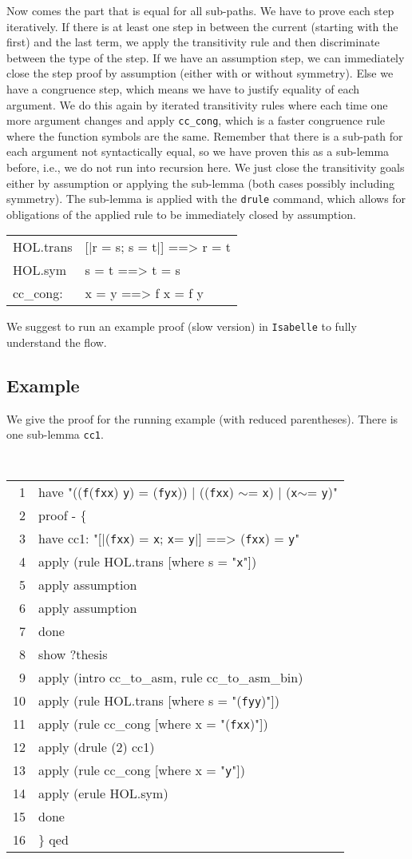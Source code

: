 \documentclass[10pt,a4paper]{article}
\newcommand{\isa}{\texttt{Isabelle}\xspace}
\newcommand{\ttt}{\texttt}
\newcommand{\negat}{\ensuremath{\sim}}
\newcommand{\x}{\xX\xspace}
\newcommand{\y}{\yX\xspace}
\newcommand{\f}{\ttt{f}\xspace}
\newcommand{\xX}{\ttt{x}}
\newcommand{\yX}{\ttt{y}}
\newenvironment{pt}[1]{\begin{center}\begin{tt}\begin{tabular}{#1}\hline}{\end{tabular}\end{tt}\end{center}}
\newcommand{\pl}[1]{#1 \\[1mm]}
\newcommand{\pll}[1]{#1 \\\hline}
\begin{document}
Now comes the part that is equal for all sub-paths. We have to prove each step iteratively. If there is at least one step in between the current (starting with the first) and the last term, we apply the transitivity rule and then discriminate between the type of the step. If we have an assumption step, we can immediately close the step proof by assumption (either with or without symmetry). Else we have a congruence step, which means we have to justify equality of each argument. We do this again by iterated transitivity rules where each time one more argument changes and apply \ttt{cc\_cong}, which is a faster congruence rule where the function symbols are the same. Remember that there is a sub-path for each argument not syntactically equal, so we have proven this as a sub-lemma before, i.e., we do not run into recursion here. We just close the transitivity goals either by assumption or applying the sub-lemma (both cases possibly including symmetry). The sub-lemma is applied with the \ttt{drule} command, which allows for obligations of the applied rule to be immediately closed by assumption.
%
\begin{pt}{ll}
	\pl{HOL.trans & [|r = s; s = t|] ==> r = t}
	\pl{HOL.sym & s = t ==> t = s}
	\pll{cc\_cong: & x = y ==> f x = f y}
\end{pt}

We suggest to run an example proof (slow version) in \isa to fully understand the flow.
%
\subsection*{Example}
We give the proof for the running example (with reduced parentheses). There is one sub-lemma \ttt{cc1}.

\begin{center}
	\tt
	\begin{tabular}{rl}
		1 & have "((\f (\f \x \x) \y) = (\f \y \x)) | ((\f \x \x) \negat= \x) | (\x \negat= \y)" \\
		2 & proof - $\lbrace$ \\
		3 & have cc1: "[|(\f \x \x) = \x; \x = \yX|] ==> (\f \x \x) = \yX" \\
		4 & apply (rule HOL.trans [where s = "\xX"]) \\
		5 & apply assumption \\
		6 & apply assumption \\
		7 & done \\
		8 & show ?thesis \\
		9 & apply (intro cc\_to\_asm, rule cc\_to\_asm\_bin) \\
		10 & apply (rule HOL.trans [where s = "(\f \y \y)"]) \\
		11 & apply (rule cc\_cong [where x = "(\f \x \x)"]) \\
		12 & apply (drule (2) cc1) \\
		13 & apply (rule cc\_cong [where x = "\yX"]) \\
		14 & apply (erule HOL.sym) \\
		15 & done \\
		16 & $\rbrace$ qed
	\end{tabular}
\end{center}
\end{document}
